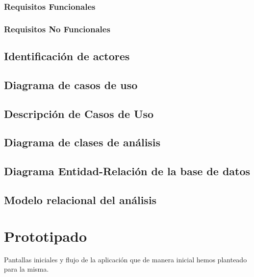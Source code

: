 \documentclass[../pfc.tex]{subfiles}
\begin{document}
			\subsubsection{Requisitos Funcionales}

			\subsubsection{Requisitos No Funcionales}
	
		\subsection{Identificación de actores}
		
		\subsection{Diagrama de casos de uso }
		
		\subsection{Descripción de Casos de Uso}
		
		\subsection{Diagrama de clases de análisis}
		
		\subsection{Diagrama Entidad-Relación de la base de datos}
		
		\subsection{Modelo relacional del análisis}
	
	\section{Prototipado}
	Pantallas iniciales y flujo de la aplicación que de manera inicial hemos planteado para la misma.
	
\end{document}
